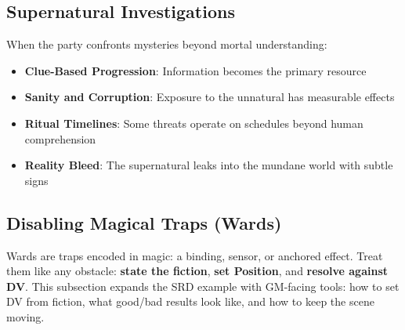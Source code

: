 \subsection*{Supernatural Investigations}

When the party confronts mysteries beyond mortal understanding:

\begin{itemize}
    \item \textbf{Clue-Based Progression}: Information becomes the primary resource
    \item \textbf{Sanity and Corruption}: Exposure to the unnatural has measurable effects
    \item \textbf{Ritual Timelines}: Some threats operate on schedules beyond human comprehension
    \item \textbf{Reality Bleed}: The supernatural leaks into the mundane world with subtle signs
\end{itemize}


\subsection{Disabling Magical Traps (Wards)}\label{subsec:disabling-wards}

Wards are traps encoded in magic: a binding, sensor, or anchored effect. Treat them like any obstacle: \textbf{state the fiction}, \textbf{set Position}, and \textbf{resolve against DV}. This subsection expands the SRD example with GM-facing tools: how to set DV from fiction, what good/bad results look like, and how to keep the scene moving.

